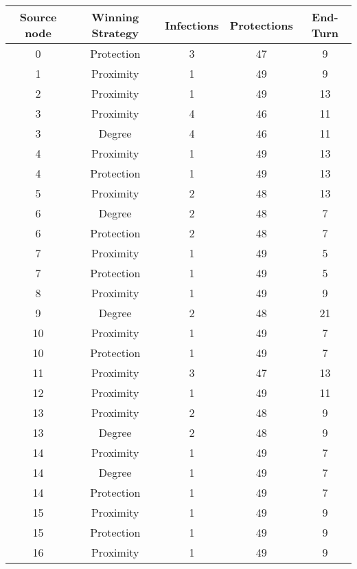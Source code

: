 \documentclass[results.tex]{subfiles}
\begin{document}
\begin{center}
  \begin{tabular}{| c || c | c | c | c |}
    \hline
    {\bfseries Source node} & {\bfseries Winning Strategy} & {\bfseries Infections} & {\bfseries Protections} & {\bfseries End-Turn} \\  %
    \hline\hline
    0 & Protection & 3 & 47 & 9 \\ 
    \hline
    1 & Proximity & 1 & 49 & 9 \\ 
    \hline
    2 & Proximity & 1 & 49 & 13 \\ 
    \hline
    3 & Proximity & 4 & 46 & 11 \\ 
    \hline
    3 & Degree & 4 & 46 & 11 \\ 
    \hline
    4 & Proximity & 1 & 49 & 13 \\ 
    \hline
    4 & Protection & 1 & 49 & 13 \\ 
    \hline
    5 & Proximity & 2 & 48 & 13 \\ 
    \hline
    6 & Degree & 2 & 48 & 7 \\ 
    \hline
    6 & Protection & 2 & 48 & 7 \\ 
    \hline
    7 & Proximity & 1 & 49 & 5 \\ 
    \hline
    7 & Protection & 1 & 49 & 5 \\ 
    \hline
    8 & Proximity & 1 & 49 & 9 \\ 
    \hline
    9 & Degree & 2 & 48 & 21 \\ 
    \hline
    10 & Proximity & 1 & 49 & 7 \\ 
    \hline
    10 & Protection & 1 & 49 & 7 \\ 
    \hline
    11 & Proximity & 3 & 47 & 13 \\ 
    \hline
    12 & Proximity & 1 & 49 & 11 \\ 
    \hline
    13 & Proximity & 2 & 48 & 9 \\ 
    \hline
    13 & Degree & 2 & 48 & 9 \\ 
    \hline
    14 & Proximity & 1 & 49 & 7 \\ 
    \hline
    14 & Degree & 1 & 49 & 7 \\ 
    \hline
    14 & Protection & 1 & 49 & 7 \\ 
    \hline
    15 & Proximity & 1 & 49 & 9 \\ 
    \hline
    15 & Protection & 1 & 49 & 9 \\ 
    \hline
    16 & Proximity & 1 & 49 & 9 \\ 
    \hline

\end{tabular}
\end{center}
\end{document}
